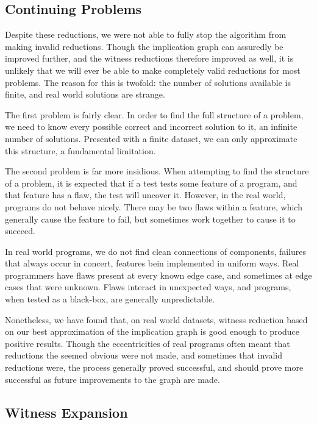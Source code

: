 \documentclass[11pt,twoside]{article}
\begin{document}
\subsection{Continuing Problems}

Despite these reductions, we were not able to fully stop the algorithm from making invalid reductions. Though the implication graph can assuredly be improved further, and the witness reductions therefore improved as well, it is unlikely that we will ever be able to make completely valid reductions for most problems. The reason for this is twofold: the number of solutions available is finite, and  real world solutions are strange.

The first problem is fairly clear. In order to find the full structure of a problem, we need to know every possible correct and incorrect solution to it, an infinite  number of solutions. Presented with a finite dataset, we can only approximate this structure, a fundamental limitation.

The second problem is far more insidious. When attempting to find the structure of a problem, it is expected that if a test tests some feature of a program, and that feature has a flaw, the test will uncover it. However, in the real world, programs do not behave nicely. There may be two flaws within a feature, which generally cause the feature to fail, but sometimes work together to cause it to succeed.

In real world programs, we do not find clean connections of components, failures that always occur in concert, features bein implemented in uniform ways. Real programmers have flaws present at every known edge case, and sometimes at edge cases that were unknown. Flaws interact in unexpected ways, and programs, when tested as a black-box, are generally unpredictable.

Nonetheless, we have found that, on real world datasets, witness reduction based on our best approximation of the implication graph is good enough to produce positive results. Though the eccentricities of real programs often meant that reductions the seemed obvious were not made, and sometimes that invalid reductions were, the process generally proved successful, and should prove more successful as future improvements to the graph are made.

\subsection{Witness Expansion}
\end{document}
